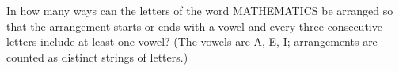 In how many ways can the letters of the word MATHEMATICS be arranged so that the arrangement starts or ends with a vowel and every three consecutive letters include at least one vowel? (The vowels are A, E, I; arrangements are counted as distinct strings of letters.)
